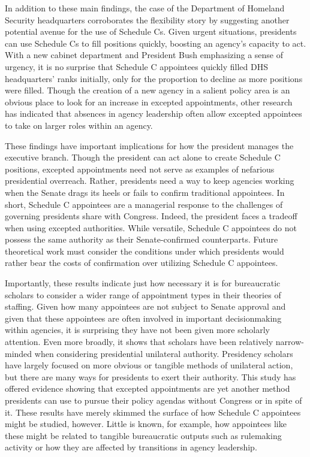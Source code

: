 \documentclass[12pt]{article}
\begin{document}
In addition to these main findings, the case of the Department of Homeland Security headquarters corroborates the flexibility story by suggesting another potential avenue for the use of Schedule Cs. Given urgent situations, presidents can use Schedule Cs to fill positions quickly, boosting an agency's capacity to act. With a new cabinet department and President Bush emphasizing a sense of urgency, it is no surprise that Schedule C appointees quickly filled DHS headquarters' ranks initially, only for the proportion to decline as more positions were filled. Though the creation of a new agency in a salient policy area is an obvious place to look for an increase in excepted appointments, other research has indicated that absences in agency leadership often allow excepted appointees to take on larger roles within an agency.

These findings have important implications for how the president manages the executive branch. Though the president can act alone to create Schedule C positions, excepted appointments need not serve as examples of nefarious presidential overreach. Rather, presidents need a way to keep agencies working when the Senate drags its heels or fails to confirm traditional appointees. In short, Schedule C appointees are a managerial response to the challenges of governing presidents share with Congress. Indeed, the president faces a tradeoff when using excepted authorities. While versatile, Schedule C appointees do not possess the same authority as their Senate-confirmed counterparts. Future theoretical work must consider the conditions under which presidents would rather bear the costs of confirmation over utilizing Schedule C appointees.

Importantly, these results indicate just how necessary it is for bureaucratic scholars to consider a wider range of appointment types in their theories of staffing. Given how many appointees are not subject to Senate approval and given that these appointees are often involved in important decisionmaking within agencies, it is surprising they have not been given more scholarly attention. Even more broadly, it shows that scholars have been relatively narrow-minded when considering presidential unilateral authority. Presidency scholars have largely focused on more obvious or tangible methods of unilateral action, but there are many ways for presidents to exert their authority. This study has offered evidence showing that excepted appointments are yet another method presidents can use to pursue their policy agendas without Congress or in spite of it. These results have merely skimmed the surface of how Schedule C appointees might be studied, however. Little is known, for example, how appointees like these might be related to tangible bureaucratic outputs such as rulemaking activity or how they are affected by transitions in agency leadership.
\end{document}
